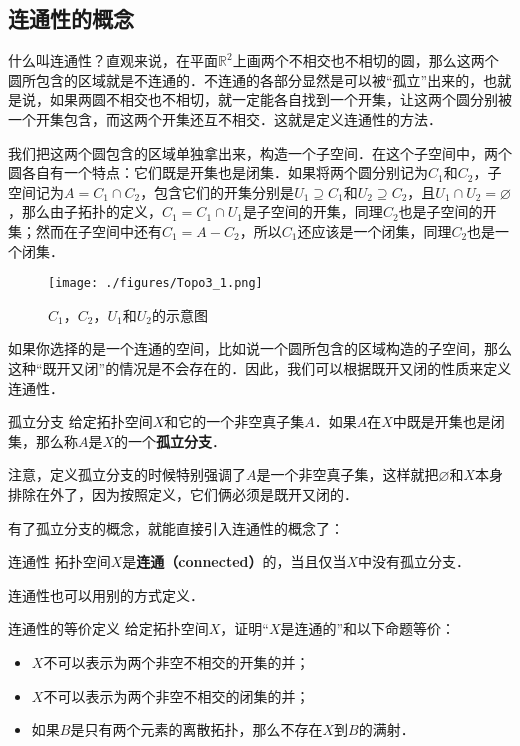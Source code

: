 
\subsection{连通性的概念}
什么叫连通性？直观来说，在平面$\mathbb{R}^2$上画两个不相交也不相切的圆，那么这两个圆所包含的区域就是不连通的．不连通的各部分显然是可以被“孤立”出来的，也就是说，如果两圆不相交也不相切，就一定能各自找到一个开集，让这两个圆分别被一个开集包含，而这两个开集还互不相交．这就是定义连通性的方法．

我们把这两个圆包含的区域单独拿出来，构造一个子空间．在这个子空间中，两个圆各自有一个特点：它们既是开集也是闭集．如果将两个圆分别记为$C_1$和$C_2$，子空间记为$A=C_1\cap C_2$，包含它们的开集分别是$U_1\supseteq C_1$和$U_2\supseteq C_2$，且$U_1\cap U_2=\varnothing$，那么由子拓扑的定义，$C_1=C_1\cap U_1$是子空间的开集，同理$C_2$也是子空间的开集；然而在子空间中还有$C_1=A-C_2$，所以$C_1$还应该是一个闭集，同理$C_2$也是一个闭集．

\begin{figure}[ht]
\centering
\texttt{[image: ./figures/Topo3\_1.png]}
\caption{$C_1$，$C_2$，$U_1$和$U_2$的示意图} \label{Topo3_fig1}
\end{figure}

如果你选择的是一个连通的空间，比如说一个圆所包含的区域构造的子空间，那么这种“既开又闭”的情况是不会存在的．因此，我们可以根据既开又闭的性质来定义连通性．

\begin{definition}{孤立分支}
给定拓扑空间$X$和它的一个非空真子集$A$．如果$A$在$X$中既是开集也是闭集，那么称$A$是$X$的一个\textbf{孤立分支}．
\end{definition}

注意，定义孤立分支的时候特别强调了$A$是一个非空真子集，这样就把$\varnothing$和$X$本身排除在外了，因为按照定义，它们俩必须是既开又闭的．

有了孤立分支的概念，就能直接引入连通性的概念了：

\begin{definition}{连通性}
拓扑空间$X$是\textbf{连通（connected）}的，当且仅当$X$中没有孤立分支．
\end{definition}

连通性也可以用别的方式定义．

\begin{exercise}{连通性的等价定义}\label{Topo3_exe1}
给定拓扑空间$X$，证明“$X$是连通的”和以下命题等价：
\begin{itemize}
\item $X$不可以表示为两个非空不相交的开集的并；
\item $X$不可以表示为两个非空不相交的闭集的并；
\item 如果$B$是只有两个元素的离散拓扑，那么不存在$X$到$B$的满射．

\end{itemize}
\end{exercise}

